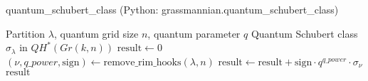 \begin{algorithm}[H]
\caption{quantum\_schubert\_class (Python: grassmannian.quantum\_schubert\_class)}
\begin{algorithmic}[1]
\REQUIRE Partition $\lambda$, quantum grid size $n$, quantum parameter $q$
\ENSURE Quantum Schubert class $\sigma_\lambda$ in $QH^*(Gr(k,n))$
\STATE $\text{result} \gets 0$
    \STATE $(\nu, q\_power, \text{sign}) \gets \text{remove\_rim\_hooks}(\lambda, n)$
        \STATE $\text{result} \gets \text{result} + \text{sign} \cdot q^{q\_power} \cdot \sigma_\nu$
    \ENDIF
\ENDFOR
\RETURN $\text{result}$
\end{algorithmic}
\end{algorithm}
